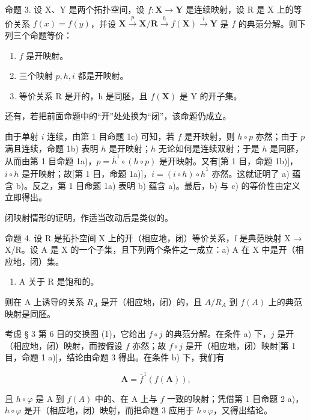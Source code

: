 命题 3. 设 X、Y 是两个拓扑空间，设 \(f: \mathbf{X} \to \mathbf{Y}\) 是连续映射，设 R 是 X 上的等价关系 \(f(x) = f(y)\)，并设 \(\mathbf{X} \xrightarrow{p} \mathbf{X}/\mathbf{R} \xrightarrow{h} f(\mathbf{X}) \xrightarrow{i} \mathbf{Y}\) 是 \(f\) 的典范分解。则下列三个命题等价：

\begin{enumerate}
\def\labelenumi{\alph{enumi})}
\item
  \(f\) 是开映射。
\item
  三个映射 \(p, h, i\) 都是开映射。
\item
  等价关系 R 是开的，h 是同胚，且 \(f(\mathbf{X})\) 是 Y 的开子集。
\end{enumerate}

还有，若把前面命题中的“开”处处换为“闭”，该命题仍成立。

由于单射 \(i\) 连续，由第 1 目命题 1c) 可知，若 \(f\) 是开映射，则 \(h \circ p\) 亦然；由于 \(p\) 满且连续，命题 1b) 表明 \(h\) 是开映射；\(h\) 无论如何是连续双射；于是 \(h\) 是同胚，从而由第 1 目命题 1a)，\(p = \overline{h}^1 \circ (h \circ p)\) 是开映射。又有{[}第 1 目，命题 1b){]}，\(i \circ h\) 是开映射；故{[}第 1 目，命题 1a){]}，\(i = (i \circ h) \circ \overline{h}^1\) 亦然。这就证明了 a) 蕴含 b)。反之，第 1 目命题 1a) 表明 b) 蕴含 a)。最后，b) 与 c) 的等价性由定义立即得出。

闭映射情形的证明，作适当改动后是类似的。

命题 4. 设 R 是拓扑空间 X 上的开（相应地，闭）等价关系，f 是典范映射 X → X/R。设 A 是 X 的一个子集，且下列两个条件之一成立：a) A 在 X 中是开（相应地，闭）集。

\begin{enumerate}
\def\labelenumi{\alph{enumi})}
\setcounter{enumi}{1}
\tightlist
\item
  A 关于 R 是饱和的。
\end{enumerate}

则在 A 上诱导的关系 \(R_{A}\) 是开（相应地，闭）的，且 \(A/R_{A}\) 到 \(f(A)\) 上的典范映射是同胚。

考虑 § 3 第 6 目的交换图 (1)，它给出 \(f \circ j\) 的典范分解。在条件 a) 下，\(j\) 是开（相应地，闭）映射，而按假设 \(f\) 亦然；故 \(f \circ j\) 是开（相应地，闭）映射{[}第 1 目，命题 1 a){]}，结论由命题 3 得出。在条件 b) 下，我们有

\[
\mathbf {A} = \overline {{{f}}} ^ {1} (f (\mathbf {A})),
\]

且 \(h \circ \varphi\) 是 A 到 \(f(A)\) 中的、在 A 上与 \(f\) 一致的映射；凭借第 1 目命题 2 a)，\(h \circ \varphi\) 是开（相应地，闭）映射，而把命题 3 应用于 \(h \circ \varphi\)，又得出结论。

